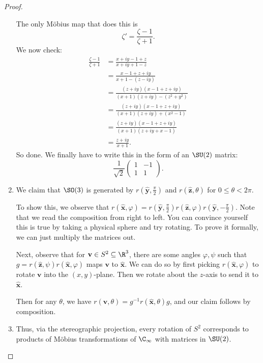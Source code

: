 \documentclass[a4paper]{article}
\begin{document}
\begin{proof}
\begin{enumerate}
\begin{center}
      \end{center}
      The only M\"obius map that does this is
      \[
        \zeta' = \frac{\zeta - 1}{\zeta + 1}.
      \]
      We now check:
      \begin{align*}
        \frac{\zeta - 1}{\zeta + 1} &= \frac{x + iy - 1 + z}{x + iy + 1 - z}\\
        &= \frac{x - 1 + z + iy}{x + 1 - (z - iy)}\\
        &= \frac{(z + iy)(x - 1 + z + iy)}{(x + 1)(z + iy) - (z^2 + y^2)}\\
        &= \frac{(z + iy)(x - 1 + z + iy)}{(x + 1)(z + iy) + (x^2 - 1)}\\
        &= \frac{(z + iy)(x - 1 + z + iy)}{(x + 1)(z + iy + x - 1)}\\
        &= \frac{z + iy}{x + 1}.
      \end{align*}
      So done. We finally have to write this in the form of an $\SU(2)$ matrix:
      \[
        \frac{1}{\sqrt{2}}
        \begin{pmatrix}
          1 & -1\\
          1 & 1
        \end{pmatrix}.
      \]
    \item We claim that $\SO(3)$ is generated by $r\left(\hat{\mathbf{y}}, \frac{\pi}{2}\right)$ and $r(\hat{\mathbf{z}}, \theta)$ for $0 \leq \theta < 2\pi$.

      To show this, we observe that $r(\hat{\mathbf{x}}, \varphi) = r(\hat{\mathbf{y}}, \frac{\pi}{2}) r(\hat{\mathbf{z}}, \varphi) r(\hat{\mathbf{y}}, -\frac{\pi}{2})$. Note that we read the composition from right to left. You can convince yourself this is true by taking a physical sphere and try rotating. To prove it formally, we can just multiply the matrices out.

      Next, observe that for $\mathbf{v} \in S^2 \subseteq \R^3$, there are some angles $\varphi, \psi$ such that $g = r(\hat{\mathbf{z}}, \psi) r(\hat{\mathbf{x}}, \varphi)$ maps $\mathbf{v}$ to $\hat{\mathbf{x}}$. We can do so by first picking $r(\hat{\mathbf{x}}, \varphi)$ to rotate $\mathbf{v}$ into the $(x, y)$-plane. Then we rotate about the $z$-axis to send it to $\hat{\mathbf{x}}$.

      Then for any $\theta$, we have $r(\mathbf{v}, \theta) = g^{-1} r(\hat{\mathbf{x}}, \theta) g$, and our claim follows by composition.
    \item Thus, via the stereographic projection, every rotation of $S^2$ corresponds to products of M\"obius transformations of $\C_\infty$ with matrices in $\SU(2)$.
  \end{enumerate}
\end{proof}
\end{document}
